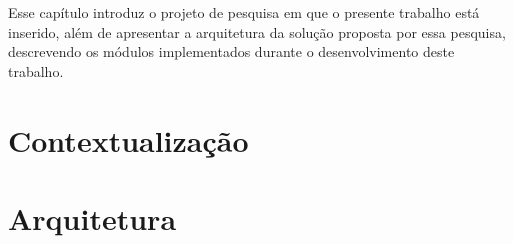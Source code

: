 Esse capítulo introduz o projeto de pesquisa em que o presente trabalho está inserido, além de apresentar a arquitetura da solução proposta por essa pesquisa, descrevendo os módulos implementados durante o desenvolvimento deste trabalho.

\section{Contextualização}


\section{Arquitetura}


